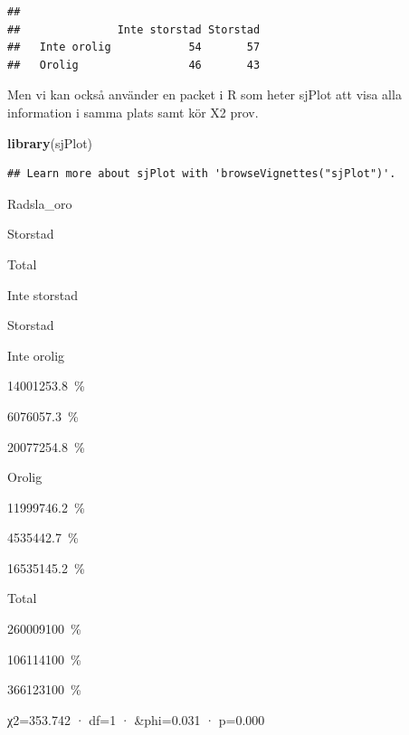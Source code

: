 \documentclass[
]{book}
\newenvironment{Shaded}{\begin{snugshade}}{\end{snugshade}}
\newcommand{\AttributeTok}[1]{\textcolor[rgb]{0.13,0.29,0.53}{#1}}
\newcommand{\ConstantTok}[1]{\textcolor[rgb]{0.56,0.35,0.01}{#1}}
\newcommand{\FunctionTok}[1]{\textcolor[rgb]{0.13,0.29,0.53}{\textbf{#1}}}
\newcommand{\NormalTok}[1]{#1}
\newcommand{\SpecialCharTok}[1]{\textcolor[rgb]{0.81,0.36,0.00}{\textbf{#1}}}
\begin{document}
\begin{verbatim}
##              
##               Inte storstad Storstad
##   Inte orolig            54       57
##   Orolig                 46       43
\end{verbatim}

Men vi kan också använder en packet i R som heter sjPlot att visa alla information
i samma plats samt kör X2 prov.

\begin{Shaded}
\begin{Highlighting}[]
\FunctionTok{library}\NormalTok{(sjPlot)}
\end{Highlighting}
\end{Shaded}

\begin{verbatim}
## Learn more about sjPlot with 'browseVignettes("sjPlot")'.
\end{verbatim}

\begin{Shaded}
\end{Shaded}

Radsla\_oro

Storstad

Total

Inte storstad

Storstad

Inte orolig

{140012}{53.8~\%}

{60760}{57.3~\%}

{200772}{54.8~\%}

Orolig

{119997}{46.2~\%}

{45354}{42.7~\%}

{165351}{45.2~\%}

Total

{260009}{100~\%}

{106114}{100~\%}

{366123}{100~\%}

χ2=353.742 · df=1 · \&phi=0.031 · p=0.000
\end{document}
